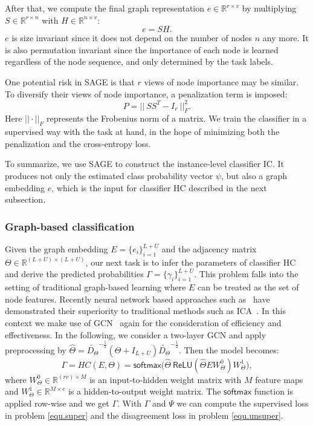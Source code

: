 \documentclass[sigconf]{acmart}
\newcommand{\eat}[1]{}
\begin{document}
After that, we compute the final graph representation $e \in \mathbb{R}^{r \times v}$ by multiplying $ S\in \mathbb{R}^{r \times n}$ with $H \in \mathbb{R}^{n \times v}$:
\begin{equation}
e = SH.
\end{equation}
$e$ is size invariant since it does not depend on the number of nodes $n$ any more.  It is also permutation invariant since the importance of each node is learned regardless of the node sequence, and only determined by the task labels.

One potential risk in SAGE is that $r$ views of node importance may be similar. To diversify their views of node importance, a penalization term is imposed:
\begin{equation}
P = \big|\big|\ SS^T - I_r\ \big|\big|_F^2.
\end{equation}
Here $\big|\big|\cdot\big|\big|_F$ represents the Frobenius norm of a matrix.  We train the classifier in a supervised way with the task at hand, in the hope of minimizing both the penalization and the cross-entropy loss.

To summarize, we use SAGE to construct the instance-level classifier IC.  It produces not only the estimated class probability vector $\psi$, but also a graph embedding $e$, which is the input for classifier HC described in the next subsection.

\subsubsection{Graph-based classification}\label{ssc}
Given the graph embedding $E = \{e_i\}_{i=1}^{L+U}$ and the adjacency matrix $\Theta \in \mathbb{R}^{(L+U) \times (L+U)}$, our next task is to infer the parameters of classifier HC and derive the predicted probabilities $\Gamma = \{\gamma_i\}_{i=1}^{L+U}$. \eat{It is done by solving problem \eqref{equ.super} while holding $E$ constant.} This problem falls into the setting of traditional graph-based learning where $E$ can be treated as the set of node features.  Recently neural network based approaches such as~\cite{kipf2017semi,yang2016revisiting} have demonstrated their superiority to traditional methods such as ICA~\cite{sen2008collective}.  In this context we make use of GCN~\cite{kipf2017semi} again for the consideration of efficiency and effectiveness. In the following, we consider a two-layer GCN and apply preprocessing by $\hat{\Theta} = \tilde{D_{\Theta}}^{-\frac{1}{2}}(\Theta + I_{L+U})\tilde{D_{\Theta}}^{-\frac{1}{2}}$. Then the model becomes:
\begin{equation}
  \Gamma = HC(E,\Theta) = \textsf{softmax} \big(\hat{\Theta}\ \textsf{ReLU}(\hat{\Theta}EW_{\Theta}^0)W_{\Theta}^1\big),
\label{Eq:GCN}
\end{equation}
where $W_{\Theta}^0 \in \mathbb{R}^{(rv) \times M}$ is an input-to-hidden weight matrix with $M$ feature maps and $W_{\Theta}^1 \in \mathbb{R}^{M \times c}$ is a hidden-to-output weight matrix. The $\textsf{softmax}$ function is applied row-wise and we get $\Gamma$.  With $\Gamma$ and $\Psi$ we can compute the supervised loss in problem \eqref{equ.super} and the disagreement loss in problem \eqref{equ.unsuper}.
\end{document}
